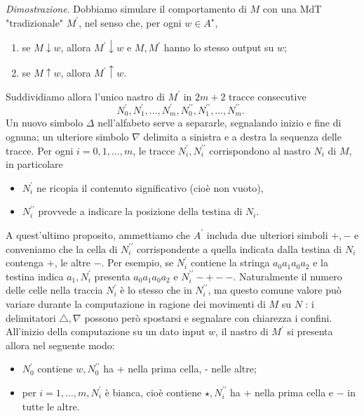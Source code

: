 \textit{Dimostrazione}.
Dobbiamo simulare il comportamento di $M$ con una MdT "tradizionale" $M^{\prime}$,
nel senso che, per ogni $w \in A^{\star}$,

\begin{enumerate}
    \item se $M \downarrow w$, allora $M^{\prime} \downarrow w$ e $M, M^{\prime}$
          hanno lo stesso output su $w$;
    \item se $M \uparrow w$, allora $M^{\prime} \uparrow w$.
\end{enumerate}

Suddividiamo allora l'unico nastro di $M^{\prime}$ in $2 m+2$ tracce consecutive
$$
    N_0^{\prime}, N_1^{\prime}, \ldots, N_m^{\prime}, N_0^{\prime \prime}, N_1^{\prime \prime}, \ldots, N_m^{\prime \prime} \text {. }
$$
Un nuovo simbolo $\Delta$ nell'alfabeto serve a separarle, segnalando inizio e fine
di ognuna; un ulteriore simbolo $\nabla$ delimita a sinistra e a destra la sequenza
delle tracce. Per ogni $i=0,1, \ldots, m$, le tracce $N_i^{\prime}, N_i^{\prime
    \prime}$ corrispondono al nastro $N_i$ di $M$, in particolare

\begin{itemize}
    \item $N_i^{\prime}$ ne ricopia il contenuto significativo (cioè non vuoto),
    \item $N_i^{\prime \prime}$ provvede a indicare la posizione della testina di
          $N_i$.
\end{itemize}

A quest'ultimo proposito, ammettiamo che $A^{\prime}$ includa due ulteriori simboli
$+,-$ e conveniamo che la cella di $N_i^{\prime \prime}$ corrispondente a quella
indicata dalla testina di $N_i$ contenga $+$, le altre $-$. Per esempio, se
$N_i^{\prime}$ contiene la stringa $a_0 a_1 a_0 a_2$ e la testina indica $a_1,
    N_i^{\prime}$ presenta $a_0 a_1 a_0 a_2$ e $N_i^{\prime \prime}-+--$. Naturalmente il
numero delle celle nella traccia $N_i^{\prime}$ è lo stesso che in $N_i^{\prime
    \prime}$, ma questo comune valore può variare durante la computazione in ragione dei
movimenti di $M$ su $N$ : i delimitatori $\triangle, \nabla$ possono però spostarsi e
segnalare con chiarezza i confini. All'inizio della computazione su un dato input
$w$, il nastro di $M^{\prime}$ si presenta allora nel seguente modo:

\begin{itemize}
    \item $N_0^{\prime}$ contiene $w, N_0^{\prime \prime}$ ha + nella prima cella, -
          nelle altre;
    \item  per $i=1, \ldots, m, N_i^{\prime}$ è bianca, cioè contiene $\star,
              N_i^{\prime \prime}$ ha $+$ nella prima cella e $-$ in tutte le altre.
\end{itemize}

